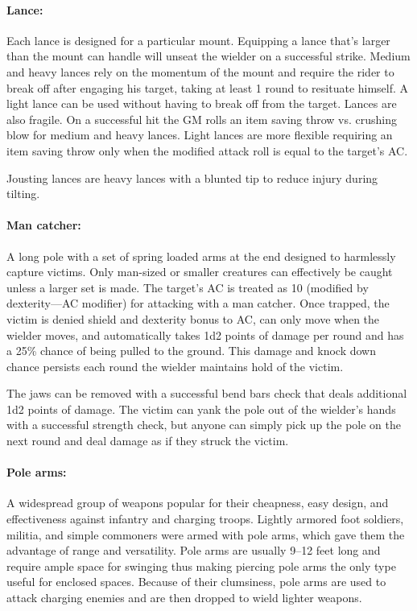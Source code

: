 \begin{multicols}{2}
\paragraph{Lance:} Each lance is designed for a particular mount.  Equipping a lance that's larger than the mount can handle will unseat the wielder on a successful strike.  Medium and heavy lances rely on the momentum of the mount and require the rider to break off after engaging his target, taking at least 1 round to resituate himself.  A light lance can be used without having to break off from the target.  Lances are also fragile.  On a successful hit the GM rolls an item saving throw vs. crushing blow for medium and heavy lances.  Light lances are more flexible requiring an item saving throw only when the modified attack roll is equal to the target's AC.

Jousting lances are heavy lances with a blunted tip to reduce injury during tilting.

\paragraph{Man catcher:} A long pole with a set of spring loaded arms at the end designed to harmlessly capture victims.  Only man-sized or smaller creatures can effectively be caught unless a larger set is made.  The target's AC is treated as 10 (modified by dexterity---AC modifier) for attacking with a man catcher.  Once trapped, the victim is denied shield and dexterity bonus to AC, can only move when the wielder moves, and automatically takes 1d2 points of damage per round and has a 25\% chance of being pulled to the ground.  This damage and knock down chance persists each round the wielder maintains hold of the victim.

The jaws can be removed with a successful bend bars check that deals additional 1d2 points of damage.  The victim can yank the pole out of the wielder's hands with a successful strength check, but anyone can simply pick up the pole on the next round and deal damage as if they struck the victim.

\paragraph{Pole arms:} A widespread group of weapons popular for their cheapness, easy design, and effectiveness against infantry and charging troops.  Lightly armored foot soldiers, militia, and simple commoners were armed with pole arms, which gave them the advantage of range and versatility.  Pole arms are usually 9--12 feet long and require ample space for swinging thus making piercing pole arms the only type useful for enclosed spaces.  Because of their clumsiness, pole arms are used to attack charging enemies and are then dropped to wield lighter weapons.


\end{multicols}
